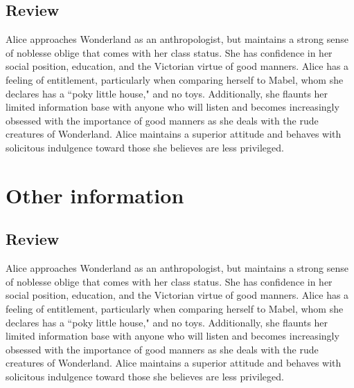 \documentclass[a4paper]{tenseconds} %
\begin{document}
\subsection{Review}

Alice approaches Wonderland as an anthropologist, but maintains a strong sense of noblesse oblige that comes with her class status. She has confidence in her social position, education, and the Victorian virtue of good manners. Alice has a feeling of entitlement, particularly when comparing herself to Mabel, whom she declares has a ``poky little house," and no toys. Additionally, she flaunts her limited information base with anyone who will listen and becomes increasingly obsessed with the importance of good manners as she deals with the rude creatures of Wonderland. Alice maintains a superior attitude and behaves with solicitous indulgence toward those she believes are less privileged.

\section{Other information}

\subsection{Review}

Alice approaches Wonderland as an anthropologist, but maintains a strong sense of noblesse oblige that comes with her class status. She has confidence in her social position, education, and the Victorian virtue of good manners. Alice has a feeling of entitlement, particularly when comparing herself to Mabel, whom she declares has a ``poky little house," and no toys. Additionally, she flaunts her limited information base with anyone who will listen and becomes increasingly obsessed with the importance of good manners as she deals with the rude creatures of Wonderland. Alice maintains a superior attitude and behaves with solicitous indulgence toward those she believes are less privileged.
\end{document}
